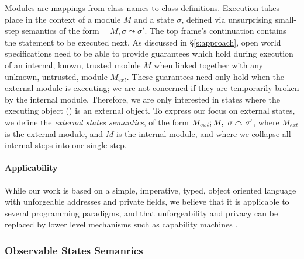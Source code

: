  
Modules are mappings from class names to class definitions. 
Execution 
takes place
 in the context of  a module $M$ and   a state $\sigma$,
 defined via unsurprising small-step semantics of the form \ \ 
   $M, \sigma \leadsto \sigma'$.
The   top frame's continuation contains the statement to be 
executed next.  
As discussed in \S \ref{s:approach}, 
{open world specifications need to be able to provide}
guarantees which hold
during execution of an internal, 
known, trusted module $M$ when linked together with any
unknown, untrusted, module $M_{ext}$. These guarantees need only hold 
when the external module is executing; we are not concerned if they are
temporarily broken by the internal module. Therefore, we are only interested in states where the
executing object (\prg{this}) is an external object. 
To express our focus on external states, we define the  \emph{external states semantics}, of the form 
$M_{ext} ; M,\ \sigma \curvearrowright \sigma'$, where $M_{ext}$ is the external
module, and $M$ is the internal module, and where we
collapse all internal steps into one single step.

\paragraph{Applicability} 
{While our work is based on 
  a simple, imperative, typed, object oriented}
language with unforgeable addresses and private fields, we believe
 that %
 it is applicable to several programming paradigms, and 
 that   unforgeability and privacy
 can be replaced 
 by lower level mechanisms such as capability machines \cite{vanproving,davis2019cheriabi}.
 
 \subsubsection{Observable States Semanrics}

